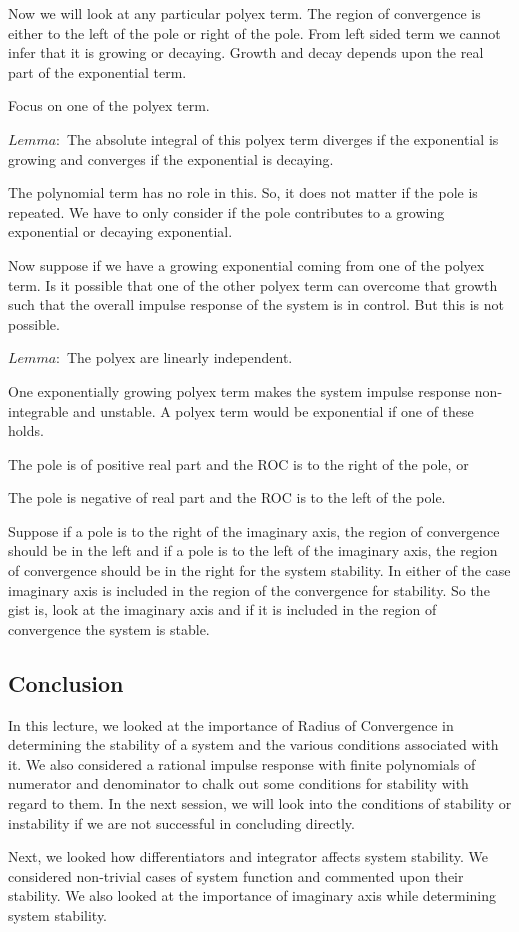 Now we will look at any particular polyex term. The region of convergence is either to the left of the pole or right of the pole.  From left sided term we cannot infer that it is growing or decaying. Growth and decay depends upon the real part of the exponential term.  

Focus on one of the polyex term.

$Lemma:$ The absolute integral of this polyex term diverges if the exponential is growing and converges if the exponential is decaying.

The polynomial term has no role in this. So, it does not matter if the pole is repeated. We have to only consider if the pole contributes to a growing exponential or decaying exponential. 

Now suppose if we have a growing exponential coming from one of the polyex term. Is it possible that one of the other polyex term can overcome that growth such that the overall impulse response of the system is in control. But this is not possible.

$Lemma:$ The polyex are linearly independent.

One exponentially growing polyex term makes the system impulse response non-integrable and unstable. A polyex term would be exponential if one of these holds.

The pole is of positive real part and the ROC is to the right of the pole, or 

The pole is negative of real part and the ROC is to the left of the pole.

Suppose if a pole is to the right of the imaginary axis, the region of convergence should be in the left and if a pole is to the left of the imaginary axis, the region of convergence should be in the right for the system stability. In either of the case imaginary axis is included in the region of the convergence for stability. So the gist is, look at the imaginary axis and if it is included in the region of convergence the system is stable. 

\subsection{Conclusion}
In this lecture, we looked at the importance of Radius of Convergence in determining the stability of a system and the various conditions associated with it. We also considered a rational impulse response with finite polynomials of numerator and denominator to chalk out some conditions for stability with regard to them. In the next session, we will look into the conditions of stability or instability if we are not successful in concluding directly.

Next, we looked how differentiators and integrator affects system stability. We considered non-trivial cases of system function and commented upon their stability.  We also looked at the importance of imaginary axis while determining system stability.








                



                     
